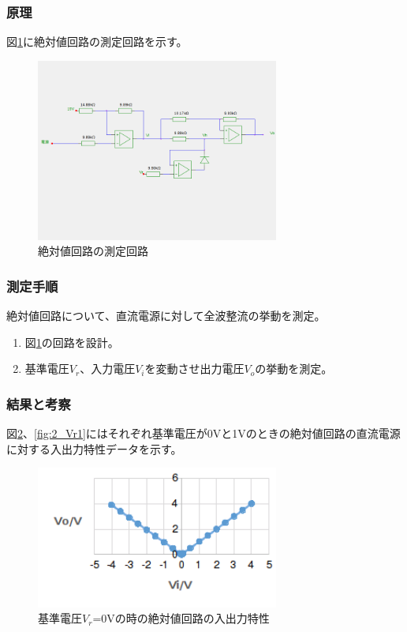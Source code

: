 \documentclass[11pt,a4j]{jsarticle}
\begin{document}
   \subsubsection{原理}
    
    図\ref{fig:abs_tokusei}に絶対値回路の測定回路を示す。
    
    \begin{figure}[htbp]
  \centering
  \includegraphics[width=8cm,clip]{abs_tokusei.png}
  \caption{絶対値回路の測定回路}
  \label{fig:abs_tokusei}
 \end{figure}%
    
   \subsubsection{測定手順}
    絶対値回路について、直流電源に対して全波整流の挙動を測定。
    \begin{enumerate}
    \item 図\ref{fig:abs_tokusei}の回路を設計。
    \item 基準電圧$V_r$、入力電圧$V_i$を変動させ出力電圧$V_o$の挙動を測定。
    \end{enumerate}
    
   \subsubsection{結果と考察}
    
    図\ref{fig:2_Vr0}、\ref{fig:2_Vr1}にはそれぞれ基準電圧が0Vと1Vのときの絶対値回路の直流電源に対する入出力特性データを示す。
    
    \begin{figure}[htbp]
  \centering
  \includegraphics[width=8cm,clip]{2_Vr0.png}
  \caption{基準電圧$V_r$=0Vの時の絶対値回路の入出力特性}
  \label{fig:2_Vr0}
 \end{figure}%
    
\end{document}
